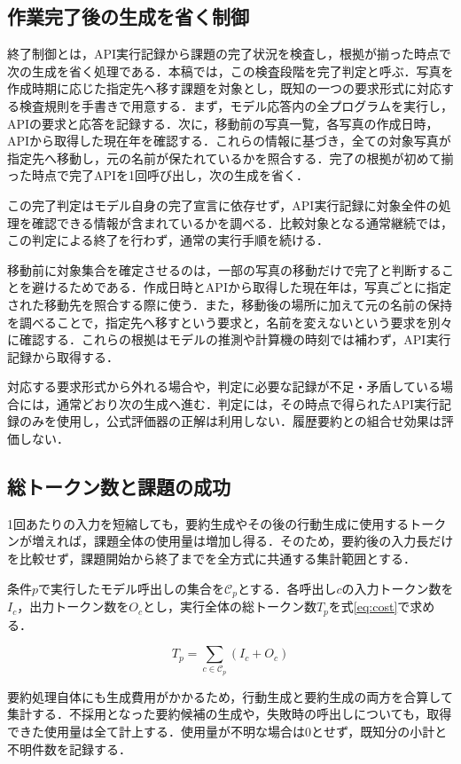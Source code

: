 \documentclass[letter]{ieicej}
\begin{document}
\subsection{作業完了後の生成を省く制御}

終了制御とは，API実行記録から課題の完了状況を検査し，根拠が揃った時点で次の生成を省く処理である．本稿では，この検査段階を完了判定と呼ぶ．写真を作成時期に応じた指定先へ移す課題を対象とし，既知の一つの要求形式に対応する検査規則を手書きで用意する．まず，モデル応答内の全プログラムを実行し，APIの要求と応答を記録する．次に，移動前の写真一覧，各写真の作成日時，APIから取得した現在年を確認する．これらの情報に基づき，全ての対象写真が指定先へ移動し，元の名前が保たれているかを照合する．完了の根拠が初めて揃った時点で完了APIを1回呼び出し，次の生成を省く．

この完了判定はモデル自身の完了宣言に依存せず，API実行記録に対象全件の処理を確認できる情報が含まれているかを調べる．比較対象となる通常継続では，この判定による終了を行わず，通常の実行手順を続ける．

移動前に対象集合を確定させるのは，一部の写真の移動だけで完了と判断することを避けるためである．作成日時とAPIから取得した現在年は，写真ごとに指定された移動先を照合する際に使う．また，移動後の場所に加えて元の名前の保持を調べることで，指定先へ移すという要求と，名前を変えないという要求を別々に確認する．これらの根拠はモデルの推測や計算機の時刻では補わず，API実行記録から取得する．

対応する要求形式から外れる場合や，判定に必要な記録が不足・矛盾している場合には，通常どおり次の生成へ進む．判定には，その時点で得られたAPI実行記録のみを使用し，公式評価器の正解は利用しない．履歴要約との組合せ効果は評価しない．

\subsection{総トークン数と課題の成功}

1回あたりの入力を短縮しても，要約生成やその後の行動生成に使用するトークンが増えれば，課題全体の使用量は増加し得る．そのため，要約後の入力長だけを比較せず，課題開始から終了までを全方式に共通する集計範囲とする．

\par\noindent\begin{minipage}{\columnwidth}
\setlength{\abovedisplayskip}{4pt}\setlength{\belowdisplayskip}{4pt}
条件$p$で実行したモデル呼出しの集合を$\mathcal C_p$とする．各呼出し$c$の入力トークン数を$I_c$，出力トークン数を$O_c$とし，実行全体の総トークン数$T_p$を\mbox{式\eqref{eq:cost}で求める．}

\begin{equation}
 T_p=\sum_{c\in\mathcal C_p}(I_c+O_c)
 \label{eq:cost}
\end{equation}

要約処理自体にも生成費用がかかるため，行動生成と要約生成の両方を合算して集計する．不採用となった要約候補の生成や，失敗時の呼出しについても，取得できた使用量は全て計上する．使用量が不明な場合は0とせず，既知分の小計と不明件数を記録する．

\end{minipage}\par{}
\end{document}
